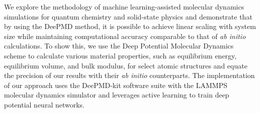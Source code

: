 We explore the methodology of machine learning-assisted molecular dynamics
simulations for quantum chemistry and solid-state physics and demonstrate that
by using the DeePMD method, it is possible to achieve linear scaling with
system size while maintaining computational accuracy comparable to that of
\textit{ab initio} calculations. To show this, we use the Deep Potential
Molecular Dynamics scheme to calculate various material properties, such as
equilibrium energy, equilibrium volume, and bulk modulus, for select atomic
structures and equate the precision of our results with their
\textit{ab initio} counterparts. The implementation of our approach uses the
DeePMD-kit software suite with the LAMMPS molecular dynamics simulator and
leverages active learning to train deep potential neural networks.
